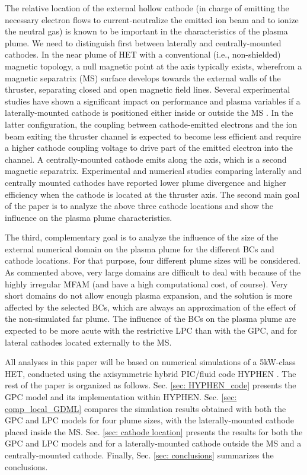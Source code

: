 \documentclass[%
 aip,
cha,
 amsmath,amssymb,
 reprint,%
]{revtex4-1}
\begin{document}
The relative location of the external hollow cathode (in charge of emitting the necessary electron flows to current-neutralize the emitted ion beam and to ionize the neutral gas) is known to be important in the characteristics of the plasma plume. We need to distinguish first between laterally and centrally-mounted cathodes.
In the near plume of HET with a conventional (i.e., non-shielded) magnetic topology, a null magnetic point at the axis typically exists, wherefrom a magnetic separatrix (MS) surface develops towards the external walls of the thruster, separating closed and open magnetic field lines. 
Several experimental studies have shown a significant impact on performance and plasma variables if a laterally-mounted cathode is positioned either inside or outside the MS \cite{somm11b,tura16,yu17,ding18}.
In the latter configuration, the coupling between cathode-emitted electrons and the ion beam exiting the thruster channel is expected to become less efficient and require a higher cathode coupling voltage to drive part of the emitted electron into the channel.
%
A centrally-mounted cathode emits along the axis, which is a second magnetic separatrix. Experimental \cite{jame07,hofe08b} and numerical \cite{cho17,cao20} studies 
comparing laterally and centrally mounted cathodes have reported lower plume divergence and higher efficiency when the cathode is located at the thruster axis. 
The second main goal of the paper is to analyze the above three cathode locations and show the influence on the plasma plume characteristics.

The third, complementary goal is to analyze the influence of the size of the external numerical domain on the plasma plume
for the different BCs and cathode locations.  
For that purpose, four different plume sizes will be considered.
As commented above, very large domains are difficult to deal with because of the highly irregular MFAM (and have a high computational cost, of course). Very short domains do not allow enough plasma expansion, and the solution is more affected by the selected BCs, which are always an approximation of the effect of the non-simulated far plume. The influence of the BCs on the plasma plume are expected to be more acute with the restrictive LPC than with the GPC, and for lateral cathodes located externally to the MS.


All analyses in this paper will be based on numerical simulations of a 5kW-class HET, 
conducted using the axisymmetric hybrid PIC/fluid code HYPHEN \cite{domi19a,domi19b,pera22b}.
The rest of the paper is organized as follows. Sec. \ref{sec: HYPHEN_code} presents the GPC model and its implementation within HYPHEN. Sec. \ref{sec: comp_local_GDML} compares the simulation results obtained with both the GPC and LPC models for four plume sizes, with the laterally-mounted cathode placed inside the MS. Sec. \ref{sec: cathode location} presents the results for both the GPC and LPC models and for a laterally-mounted cathode outside the MS and a centrally-mounted cathode. Finally, Sec. \ref{sec: conclusions} summarizes the conclusions.
\end{document}
